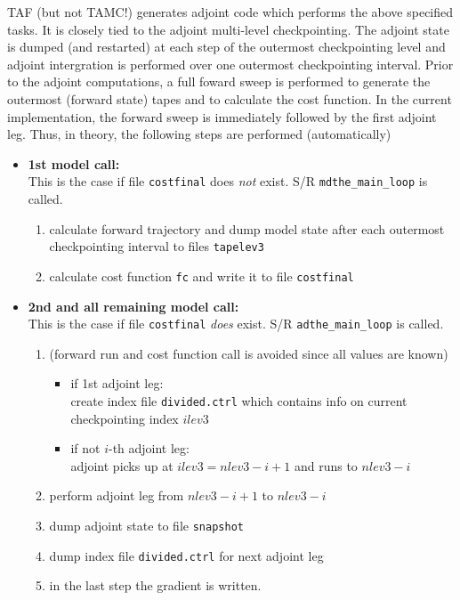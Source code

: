 TAF (but not TAMC!)
generates adjoint code which performs the above specified
tasks. It is closely tied to the adjoint multi-level checkpointing.
The adjoint state is dumped (and restarted) at each step of the
outermost checkpointing level and adjoint intergration is performed
over one outermost checkpointing interval.
Prior to the adjoint computations, a full foward sweep is performed to 
generate the outermost (forward state) tapes and to calculate
the cost function.
In the current implementation, the forward sweep is
immediately followed by the first adjoint leg.
Thus, in theory, the following steps are performed (automatically)
%
\begin{itemize}
%
\item {\bf 1st model call:} \\
This is the case if file {\tt costfinal} does {\it not} exist.
S/R {\tt mdthe\_main\_loop} is called.
%
\begin{enumerate}
%
\item
calculate forward trajectory and dump model state after each
outermost checkpointing interval to files {\tt tapelev3}
%
\item
calculate cost function {\tt fc} and write it to file
{\tt costfinal}
%
\end{enumerate}
%
\item{\bf 2nd and all remaining model call:} \\
This is the case if file {\tt costfinal} {\it does} exist.
S/R {\tt adthe\_main\_loop} is called.
%
\begin{enumerate}
%
\item
(forward run and cost function call is avoided
since all values are known)
%
\begin{itemize}
%
\item
if 1st adjoint leg: \\
create index file {\tt divided.ctrl} which contains
info on current checkpointing index $ilev3$
%
\item
if not $i$-th adjoint leg: \\
adjoint picks up at $ilev3 = nlev3-i+1$ and runs to $nlev3 - i$
%
\end{itemize}
%
\item
perform adjoint leg from $nlev3-i+1$ to $nlev3 - i$
%
\item
dump adjoint state to file {\tt snapshot}
%
\item
dump index file {\tt divided.ctrl} for next adjoint leg
%
\item
in the last step the gradient is written.
%
\end{enumerate}
%
\end{itemize}

